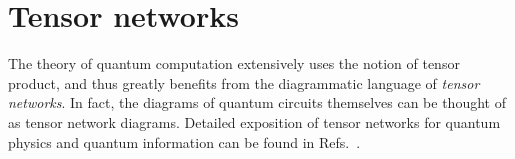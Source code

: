 






\section{Tensor networks}

The theory of quantum computation extensively uses the notion of tensor product, and thus greatly benefits from the diagrammatic language of \textit{tensor networks}. In fact, the diagrams of quantum circuits themselves can be thought of as tensor network diagrams. Detailed exposition of tensor networks for quantum physics and quantum information can be found in Refs.~\cite{biamonte_lectures_2020,bridgeman_hand-waving_2017,orus_practical_2014}.

